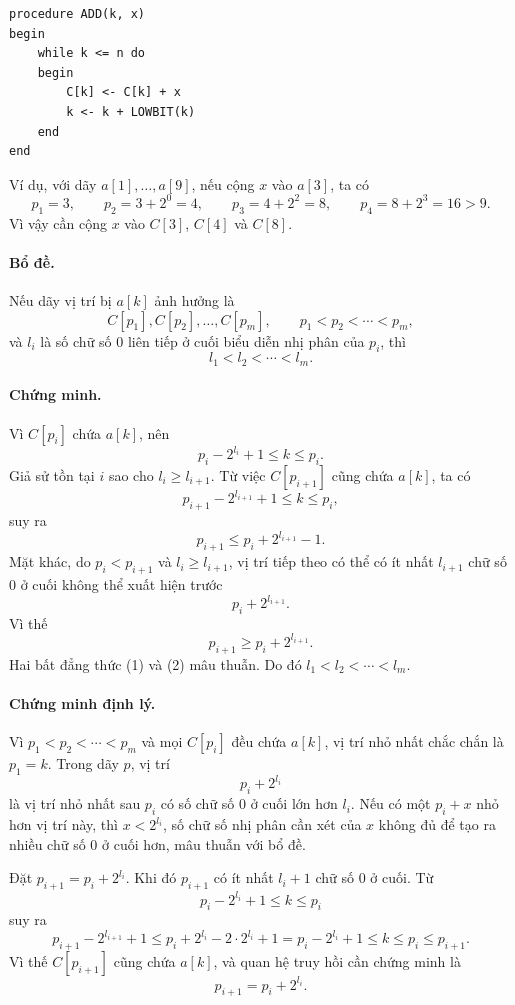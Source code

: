 \documentclass[11pt]{article}
\begin{document}
\begin{verbatim}
procedure ADD(k, x)
begin
    while k <= n do
    begin
        C[k] <- C[k] + x
        k <- k + LOWBIT(k)
    end
end
\end{verbatim}

Ví dụ, với dãy \(a[1],\ldots,a[9]\), nếu cộng \(x\) vào \(a[3]\), ta có
\[
  p_1=3,\qquad
  p_2=3+2^0=4,\qquad
  p_3=4+2^2=8,\qquad
  p_4=8+2^3=16>9.
\]
Vì vậy cần cộng \(x\) vào \(C[3]\), \(C[4]\) và \(C[8]\).

\paragraph{Bổ đề.}
Nếu dãy vị trí bị \(a[k]\) ảnh hưởng là
\[
  C[p_1],C[p_2],\ldots,C[p_m],
  \qquad p_1<p_2<\cdots<p_m,
\]
và \(l_i\) là số chữ số \(0\) liên tiếp ở cuối biểu diễn nhị phân của
\(p_i\), thì
\[
  l_1<l_2<\cdots<l_m.
\]

\paragraph{Chứng minh.}
Vì \(C[p_i]\) chứa \(a[k]\), nên
\[
  p_i-2^{l_i}+1 \le k \le p_i.
\]
Giả sử tồn tại \(i\) sao cho \(l_i\ge l_{i+1}\). Từ việc \(C[p_{i+1}]\) cũng
chứa \(a[k]\), ta có
\[
  p_{i+1}-2^{l_{i+1}}+1 \le k \le p_i,
\]
suy ra
\[
  p_{i+1}\le p_i+2^{l_{i+1}}-1. \tag{1}
\]
Mặt khác, do \(p_i<p_{i+1}\) và \(l_i\ge l_{i+1}\), vị trí tiếp theo có thể
có ít nhất \(l_{i+1}\) chữ số \(0\) ở cuối không thể xuất hiện trước
\[
  p_i+2^{l_{i+1}}.
\]
Vì thế
\[
  p_{i+1}\ge p_i+2^{l_{i+1}}. \tag{2}
\]
Hai bất đẳng thức (1) và (2) mâu thuẫn. Do đó
\(l_1<l_2<\cdots<l_m\).

\paragraph{Chứng minh định lý.}
Vì \(p_1<p_2<\cdots<p_m\) và mọi \(C[p_i]\) đều chứa \(a[k]\), vị trí nhỏ
nhất chắc chắn là \(p_1=k\). Trong dãy \(p\), vị trí
\[
  p_i+2^{l_i}
\]
là vị trí nhỏ nhất sau \(p_i\) có số chữ số \(0\) ở cuối lớn hơn \(l_i\). Nếu
có một \(p_i+x\) nhỏ hơn vị trí này, thì \(x<2^{l_i}\), số chữ số nhị phân
cần xét của \(x\) không đủ để tạo ra nhiều chữ số \(0\) ở cuối hơn, mâu thuẫn
với bổ đề.

Đặt \(p_{i+1}=p_i+2^{l_i}\). Khi đó \(p_{i+1}\) có ít nhất \(l_i+1\) chữ số
\(0\) ở cuối. Từ
\[
  p_i-2^{l_i}+1\le k\le p_i
\]
suy ra
\[
  p_{i+1}-2^{l_{i+1}}+1
  \le p_i+2^{l_i}-2\cdot 2^{l_i}+1
  = p_i-2^{l_i}+1
  \le k \le p_i \le p_{i+1}.
\]
Vì thế \(C[p_{i+1}]\) cũng chứa \(a[k]\), và quan hệ truy hồi cần chứng minh là
\[
  p_{i+1}=p_i+2^{l_i}.
\]
\end{document}
